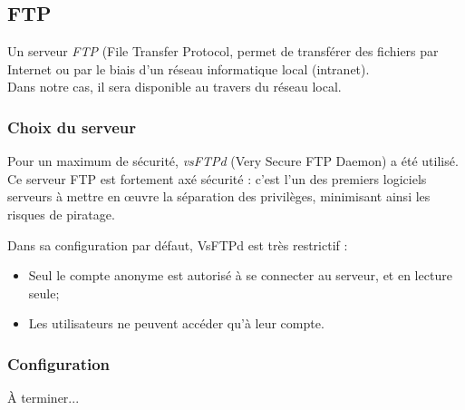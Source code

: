 \subsection{FTP}
\label{subsec:ftp}

Un serveur \emph{FTP} (File Transfer Protocol, permet de transférer des
fichiers par Internet ou par le biais d'un réseau informatique local
(intranet). \\ Dans notre cas, il sera disponible au travers du réseau local.

\subsubsection{Choix du serveur}
\label{subsubsec:choix-serveur}

Pour un maximum de sécurité, \emph{vsFTPd} (Very Secure FTP Daemon) a été utilisé. \\
Ce serveur FTP est fortement axé sécurité : c'est l'un des premiers logiciels
serveurs à mettre en œuvre la séparation des privilèges, minimisant ainsi les
risques de piratage.

Dans sa configuration par défaut, VsFTPd est très restrictif :

\begin{itemize}
    \item Seul le compte anonyme est autorisé à se connecter au serveur, et en
      lecture seule;

    \item Les utilisateurs ne peuvent accéder qu'à leur compte.
\end{itemize}

\subsubsection{Configuration}
\label{subsubsec:config}

À terminer...

